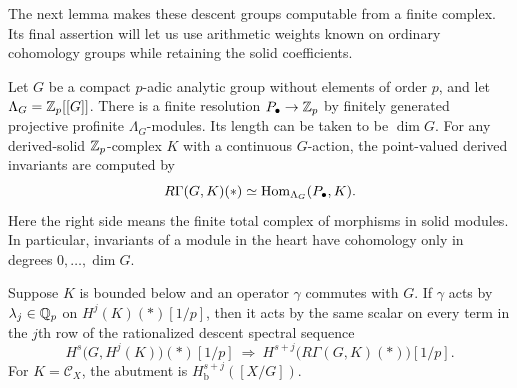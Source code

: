 The next lemma makes these descent groups computable from a finite
complex. Its final assertion will let us use arithmetic weights known
on ordinary cohomology groups while retaining the solid coefficients.

\begin{lemma}
\label{lem:solid-resolutions}
Let $G$ be a compact $p$-adic analytic group without elements of order
$p$, and let $\Lambda_G=\mathbb Z_p[[G]]$.  There is a finite resolution
$P_\bullet\to\mathbb Z_p$ by finitely generated projective profinite
$\Lambda_G$-modules.  Its length can be taken to be $\dim G$.
For any derived-solid $\mathbb Z_p$-complex $K$ with a continuous $G$-action,
the point-valued derived invariants are computed by
\begin{equation}
\label{eq:finite-resolution}
 R\Gamma(G,K)(*)\simeq
 \operatorname{Hom}_{\Lambda_G}(P_\bullet,K).
\end{equation}
Here the right side means the finite total complex of morphisms in
solid modules.  In particular, invariants of a module in the heart
have cohomology only in degrees $0,\ldots,\dim G$.

Suppose $K$ is bounded below and an operator $\gamma$ commutes with
$G$.  If $\gamma$ acts by $\lambda_j\in\mathbb Q_p$ on $H^j(K)(*)[1/p]$,
then it acts by the same scalar on every term in the $j$th row of
the rationalized descent spectral sequence
\[
 H^s\bigl(G,H^j(K)\bigr)(*)[1/p]
       \ \Longrightarrow\ H^{s+j}\bigl(R\Gamma(G,K)(*)\bigr)[1/p].
\]
For $K=\mathscr C_X$, the abutment is $H^{s+j}_{\mathrm b}([X/G])$.
\end{lemma}

